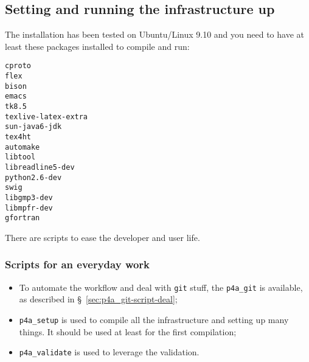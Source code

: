 \documentclass[a4paper]{article}
\begin{document}
\subsection{Setting and running the infrastructure up}
\label{sec:setup}

The installation has been tested on Ubuntu/Linux 9.10 and you need to have
at least these packages installed to compile and run:
\begin{description}
\item[\texttt{cproto}]
\item[\texttt{flex}]
\item[\texttt{bison}]
\item[\texttt{emacs}]
\item[\texttt{tk8.5}]
\item[\texttt{texlive-latex-extra}]
\item[\texttt{sun-java6-jdk}]
\item[\texttt{tex4ht}]
\item[\texttt{automake}]
\item[\texttt{libtool}]
\item[\texttt{libreadline5-dev}]
\item[\texttt{python2.6-dev}]
\item[\texttt{swig}]
\item[\texttt{libgmp3-dev}]
\item[\texttt{libmpfr-dev}]
\item[\texttt{gfortran}]
\end{description}

There are scripts to ease the developer and user life.


\subsubsection{Scripts for an everyday work}
\label{sec:an-everyday-work}

\begin{itemize}
\item To automate the \Apfa workflow and deal with \texttt{git} stuff, the
  \verb|p4a_git| is available, as described in
  \S~\ref{sec:p4a_git-script-deal};
\item \verb|p4a_setup| is used to compile all the \Apfa infrastructure and
  setting up many things. It should be used at least for the first
  compilation;
\item \verb|p4a_validate| is used to leverage the \Apips validation.
\end{itemize}
\end{document}
